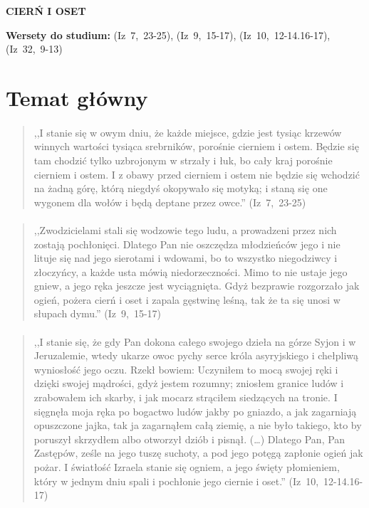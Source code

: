 \documentclass[10pt,a4paper,oneside]{article}
\begin{document}
\centerline{\textbf{\MakeUppercase{Cierń i oset}}}
\begin{center}
\textbf{Wersety do studium:} \mbox{(Iz 7, 23-25)}, \mbox{(Iz 9, 15-17)}, \mbox{(Iz 10, 12-14.16-17)}, \mbox{(Iz 32, 9-13)}
\end{center}
\section{Temat główny}
\paragraph{}
\begin{quote}
,,I stanie się w owym dniu, że każde miejsce, gdzie jest tysiąc krzewów winnych wartości tysiąca srebrników, porośnie cierniem i ostem. Będzie się tam chodzić tylko uzbrojonym w strzały i łuk, bo cały kraj porośnie cierniem i ostem. I z obawy przed cierniem i ostem nie będzie się wchodzić na żadną górę, którą niegdyś okopywało się motyką; i staną się one wygonem dla wołów i będą deptane przez owce.'' \mbox{(Iz 7, 23-25)}
\end{quote}
\paragraph{}
\begin{quote}
,,Zwodzicielami stali się wodzowie tego ludu, a prowadzeni przez nich zostają pochłonięci. Dlatego Pan nie oszczędza młodzieńców jego i nie lituje się nad jego sierotami i wdowami, bo to wszystko niegodziwcy i złoczyńcy, a każde usta mówią niedorzeczności. Mimo to nie ustaje jego gniew, a jego ręka jeszcze jest wyciągnięta. Gdyż bezprawie rozgorzało jak ogień, pożera cierń i oset i zapala gęstwinę leśną, tak że ta się unosi w słupach dymu.'' \mbox{(Iz 9, 15-17)}
\end{quote}
\paragraph{}
\begin{quote}
,,I stanie się, że gdy Pan dokona całego swojego dzieła na górze Syjon i w Jeruzalemie, wtedy ukarze owoc pychy serce króla asyryjskiego i chełpliwą wyniosłość jego oczu. Rzekł bowiem: Uczyniłem to mocą swojej ręki i dzięki swojej mądrości, gdyż jestem rozumny; zniosłem granice ludów i zrabowałem ich skarby, i jak mocarz strąciłem siedzących na tronie. I sięgnęła moja ręka po bogactwo ludów jakby po gniazdo, a jak zagarniają opuszczone jajka, tak ja zagarnąłem całą ziemię, a nie było takiego, kto by poruszył skrzydłem albo otworzył dziób i pisnął. (\ldots) Dlatego Pan, Pan Zastępów, ześle na jego tuszę suchoty, a pod jego potęgą zapłonie ogień jak pożar. I światłość Izraela stanie się ogniem, a jego święty płomieniem, który w jednym dniu spali i pochłonie jego ciernie i oset.'' \mbox{(Iz 10, 12-14.16-17)}
\end{quote}
\end{document}
